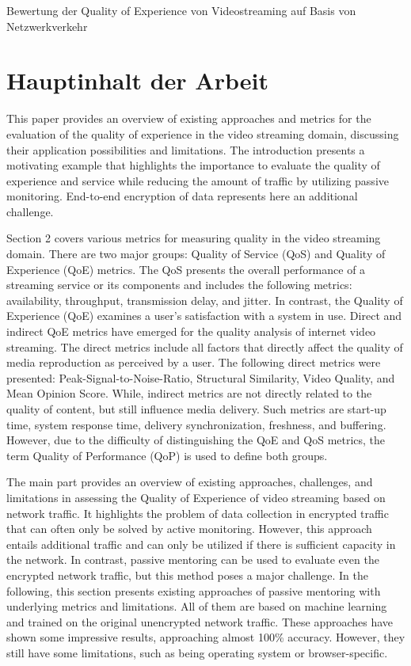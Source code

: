 \documentclass[a4paper,DIV=16]{scrartcl}
\begin{document}
Bewertung der Quality of Experience von Videostreaming auf Basis von Netzwerkverkehr


\section*{Hauptinhalt der Arbeit}

This paper provides an overview of existing approaches and metrics for the evaluation of the quality of experience in the video streaming domain, discussing their application possibilities and limitations. The introduction presents a motivating example that highlights the importance to evaluate the quality of experience and service while reducing the amount of traffic by utilizing passive monitoring. End-to-end encryption of data represents here an additional challenge.

Section 2 covers various metrics for measuring quality in the video streaming domain. There are two major groups: Quality of Service (QoS) and Quality of Experience (QoE) metrics. The QoS presents the overall performance of a streaming service or its components and includes the following metrics: availability, throughput, transmission delay, and jitter. In contrast, the Quality of Experience (QoE) examines a user's satisfaction with a system in use. Direct and indirect QoE metrics have emerged for the quality analysis of internet video streaming. The direct metrics include all factors that directly affect the quality of media reproduction as perceived by a user. The following direct metrics were presented: Peak-Signal-to-Noise-Ratio, Structural Similarity, Video Quality, and Mean Opinion Score. While, indirect metrics are not directly related to the quality of content, but still influence media delivery. Such metrics are start-up time, system response time, delivery synchronization, freshness, and buffering. However, due to the difficulty of distinguishing the QoE and QoS metrics, the term Quality of Performance (QoP) is used to define both groups.

The main part provides an overview of existing approaches, challenges, and limitations in assessing the Quality of Experience of video streaming based on network traffic. It highlights the problem of data collection in encrypted traffic that can often only be solved by active monitoring. However, this approach entails additional traffic and can only be utilized if there is sufficient capacity in the network. In contrast, passive mentoring can be used to evaluate even the encrypted network traffic, but this method poses a major challenge. In the following, this section presents existing approaches of passive mentoring with underlying metrics and limitations. All of them are based on machine learning and trained on the original unencrypted network traffic. These approaches have shown some impressive results, approaching almost 100\% accuracy. However, they still have some limitations, such as being operating system or browser-specific.
\end{document}
